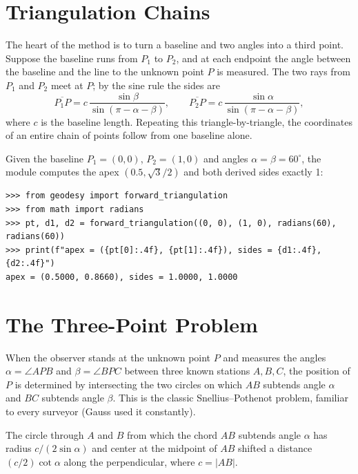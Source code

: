 \section{Triangulation Chains}

The heart of the method is to turn a baseline and two angles into a third point. Suppose the baseline runs from $P_1$ to $P_2$, and at each endpoint the angle between the baseline and the line to the unknown point $P$ is measured. The two rays from $P_1$ and $P_2$ meet at $P$; by the sine rule the sides are
\[
\overline{P_1 P} = c\,\frac{\sin \beta}{\sin(\pi - \alpha - \beta)}, \qquad
\overline{P_2 P} = c\,\frac{\sin \alpha}{\sin(\pi - \alpha - \beta)},
\]
where $c$ is the baseline length. Repeating this triangle-by-triangle, the coordinates of an entire chain of points follow from one baseline alone.

\begin{example}
Given the baseline $P_1 = (0,0)$, $P_2 = (1,0)$ and angles $\alpha = \beta = 60^\circ$, the module computes the apex $(0.5, \sqrt{3}/2)$ and both derived sides exactly 1:
\begin{lstlisting}[style=python]
>>> from geodesy import forward_triangulation
>>> from math import radians
>>> pt, d1, d2 = forward_triangulation((0, 0), (1, 0), radians(60), radians(60))
>>> print(f"apex = ({pt[0]:.4f}, {pt[1]:.4f}), sides = {d1:.4f}, {d2:.4f}")
apex = (0.5000, 0.8660), sides = 1.0000, 1.0000
\end{lstlisting}
\end{example}

\section{The Three-Point Problem}

When the observer stands at the unknown point $P$ and measures the angles $\alpha = \angle APB$ and $\beta = \angle BPC$ between three known stations $A, B, C$, the position of $P$ is determined by intersecting the two circles on which $AB$ subtends angle $\alpha$ and $BC$ subtends angle $\beta$. This is the classic  Snellius--Pothenot problem, familiar to every surveyor (Gauss used it constantly).

\begin{proposition}
The circle through $A$ and $B$ from which the chord $AB$ subtends angle $\alpha$ has radius $c/(2\sin\alpha)$ and center at the midpoint of $AB$ shifted a distance $(c/2)\cot\alpha$ along the perpendicular, where $c = \lvert AB \rvert$.
\end{proposition}


